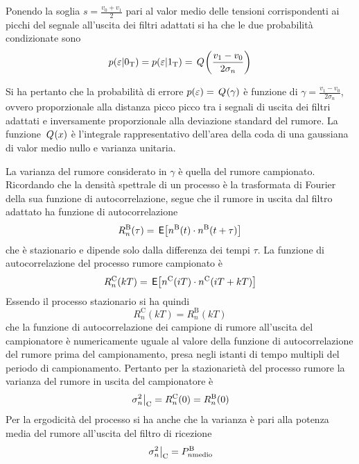 Ponendo la soglia $s=\frac{v_0+v_1}{2}$ pari al valor medio delle tensioni corrispondenti ai picchi del segnale all'uscita dei filtri adattati si ha che le due probabilità condizionate sono
\begin{equation}p(\varepsilon|0_\text{T})=p(\varepsilon|1_\text{T})=\,{Q}^{}\!\left({\frac{v_1-v_0}{2\sigma_n}}\right)\end{equation}

Si ha pertanto che la probabilità di errore $p(\varepsilon)=\,{Q}^{}\!\left({\gamma}\right)$ è funzione di $\gamma=\frac{v_1-v_0}{2\sigma_n}$, ovvero proporzionale alla distanza picco picco tra i segnali di uscita dei filtri adattati e inversamente proporzionale alla deviazione standard del rumore. La funzione $\,{Q}^{}\!\left({x}\right)$ è l'integrale rappresentativo dell'area della coda di una gaussiana di valor medio nullo e varianza unitaria.

La varianza del rumore considerato in $\gamma$ è quella del rumore campionato. Ricordando che la densità spettrale di un processo è la trasformata di Fourier della sua funzione di autocorrelazione, segue che il rumore in uscita dal filtro adattato ha funzione di autocorrelazione
\begin{equation}
R_n^\text{B}(\tau)=\,{\operatorname{\mathsf{E}}}\!\left[{n^\text{B}(t)\cdot n^\text{B}(t+\tau)}\right]
\end{equation}
che è stazionario e dipende solo dalla differenza dei tempi $\tau$.
La funzione di autocorrelazione del processo rumore campionato è
\begin{equation}
R_n^\text{C}(k T)=\,{\operatorname{\mathsf{E}}}\!\left[{n^\text{C}(i T)\cdot n^\text{C}(i T+k T)}\right]
\end{equation}
Essendo il processo stazionario si ha quindi
\begin{equation}
R_n^\text{C}(k T)=R_n^\text{B}(k T)
\end{equation}
che la funzione di autocorrelazione dei campione di rumore all'uscita del campionatore è numericamente uguale al valore della funzione di autocorrelazione del rumore prima del campionamento, presa negli istanti di tempo multipli del periodo di campionamento. Pertanto per la stazionarietà del processo rumore la varianza del rumore in uscita del campionatore è
\begin{equation}
\left.{\sigma^2_n}\right\rvert_{\text{C}}=R_n^\text{C}(0)=R_n^\text{B}(0)
\end{equation}
Per la ergodicità del processo si ha anche che la varianza è pari alla potenza media del rumore all'uscita del filtro di ricezione
\begin{equation}
\left.{\sigma^2_n}\right\rvert_{\text{C}}=P_{n \text{medio}}^\text{B}
\end{equation}

